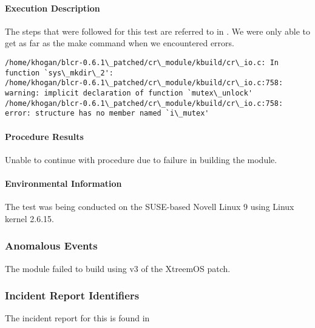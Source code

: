 \paragraph{Execution Description}
The steps that were followed for this test are referred to in . We were 
only able to get as far as the make command when we encountered errors.
\begin{lstlisting}
/home/khogan/blcr-0.6.1\_patched/cr\_module/kbuild/cr\_io.c: In function `sys\_mkdir\_2':
/home/khogan/blcr-0.6.1\_patched/cr\_module/kbuild/cr\_io.c:758: warning: implicit declaration of function `mutex\_unlock'
/home/khogan/blcr-0.6.1\_patched/cr\_module/kbuild/cr\_io.c:758: error: structure has no member named `i\_mutex'
\end{lstlisting}


\paragraph{Procedure Results}
Unable to continue with procedure due to failure in building the module.


\paragraph{Environmental Information}
The test was being conducted on the SUSE-based Novell Linux 9 using Linux kernel 2.6.15.


\subsubsection{Anomalous Events}
The module failed to build using v3 of the XtreemOS patch.


\subsubsection{Incident Report Identifiers}
The incident report for this is found in 